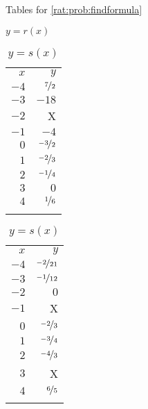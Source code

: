 \begin{exercises}
\begin{problem}
 \begin{table}[!htb]
 	\begin{widepage}
 	\centering
 	\caption{Tables for \cref{rat:prob:findformula}}
 	\label{rat:tab:findformula}
 	\begin{subtable}{.2\textwidth}
 		\centering
 		\caption{$y=r(x)$}
 		\label{rat:tab:findformular}
 		\begin{tabular}{rr}
 			\beforeheading
 			$x$  & $y$                \\ \afterheading
 			$-4$ & $\nicefrac{7}{2}$  \\\normalline
 			$-3$ & $-18$              \\\normalline
 			$-2$ & X                  \\\normalline
 			$-1$ & $-4$               \\\normalline
 			$0$  & $\nicefrac{-3}{2}$ \\\normalline
 			$1$  & $\nicefrac{-2}{3}$ \\\normalline
 			$2$  & $\nicefrac{-1}{4}$ \\\normalline
 			$3$  & $0$                \\\normalline
 			$4$  & $\nicefrac{1}{6}$  \\\lastline
 		\end{tabular}
 	\end{subtable}
 	\hfill
 	\begin{subtable}{.2\textwidth}
 		\centering
 		\caption{$y=s(x)$}
 		\label{rat:tab:findformulas}
 		\begin{tabular}{rr}
 			\beforeheading
 			$x$  & $y$                 \\ \afterheading
 			$-4$ & $\nicefrac{-2}{21}$ \\\normalline
 			$-3$ & $\nicefrac{-1}{12}$ \\\normalline
 			$-2$ & $0$                 \\\normalline
 			$-1$ & X                   \\\normalline
 			$0$  & $\nicefrac{-2}{3}$  \\\normalline
 			$1$  & $\nicefrac{-3}{4}$  \\\normalline
 			$2$  & $\nicefrac{-4}{3}$  \\\normalline
 			$3$  & X                   \\\normalline
 			$4$  & $\nicefrac{6}{5}$   \\\lastline
 		\end{tabular}
 	\end{subtable}
 	\hfill
 	\begin{subtable}{.2\textwidth}

\end{subtable}
\end{widepage}
\end{table}
\end{problem}
\end{exercises}
